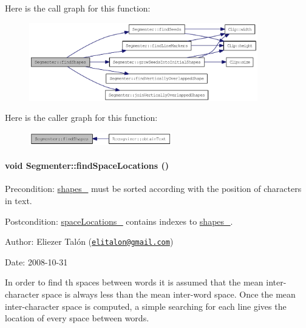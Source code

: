 Here is the call graph for this function:\nopagebreak
\begin{figure}[H]
\begin{center}
\leavevmode
\includegraphics[width=282pt]{class_segmenter_465c8e755bb56d247add080a04377520_cgraph}
\end{center}
\end{figure}


Here is the caller graph for this function:\nopagebreak
\begin{figure}[H]
\begin{center}
\leavevmode
\includegraphics[width=176pt]{class_segmenter_465c8e755bb56d247add080a04377520_icgraph}
\end{center}
\end{figure}
\hypertarget{class_segmenter_7f4ab775f61d92c4d051f6ef4685cf6f}{
\paragraph[{findSpaceLocations}]{\setlength{\rightskip}{0pt plus 5cm}void Segmenter::findSpaceLocations ()}\hfill}
\label{class_segmenter_7f4ab775f61d92c4d051f6ef4685cf6f}


\begin{Desc}
\item[Precondition:]\hyperlink{class_segmenter_41b94ede2829063e0937dc150756e77e}{shapes\_\-} must be sorted according with the position of characters in text.\end{Desc}
\begin{Desc}
\item[Postcondition:]\hyperlink{class_segmenter_b6a330577017efe9e49c174c04c4f7c3}{spaceLocations\_\-} contains indexes to \hyperlink{class_segmenter_41b94ede2829063e0937dc150756e77e}{shapes\_\-}.\end{Desc}
\begin{Desc}
\item[Author:]Eliezer Talón (\href{mailto:elitalon@gmail.com}{\tt elitalon@gmail.com}) \end{Desc}
\begin{Desc}
\item[Date:]2008-10-31\end{Desc}
In order to find th spaces between words it is assumed that the mean inter-character space is always less than the mean inter-word space. Once the mean inter-character space is computed, a simple searching for each line gives the location of every space between words. 


